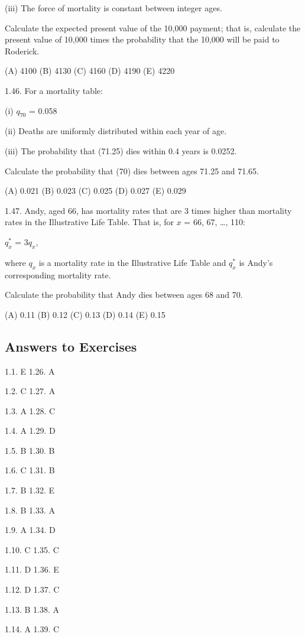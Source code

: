 \documentclass[]{book}
\begin{document}
(iii) The force of mortality is constant between integer ages.

Calculate the expected present value of the 10,000 payment; that is,
calculate the present value of 10,000 times the probability that the
10,000 will be paid to Roderick.

(A) 4100 (B) 4130 (C) 4160 (D) 4190 (E) 4220

1.46. For a mortality table:

(i) \(q_{70}\) = 0.058

(ii) Deaths are uniformly distributed within each year of age.

(iii) The probability that (71.25) dies within 0.4 years is 0.0252.

Calculate the probability that (70) dies between ages 71.25 and 71.65.

(A) 0.021 (B) 0.023 (C) 0.025 (D) 0.027 (E) 0.029

1.47. Andy, aged 66, has mortality rates that are 3 times higher than
mortality rates in the Illustrative Life Table. That is, for \(x\) = 66,
67, \ldots{}, 110:

\(q^{*}_x\) = 3\(q_x\),

where \(q_x\) is a mortality rate in the Illustrative Life Table and
\(q^{*}_x\) is Andy's corresponding mortality rate.

Calculate the probability that Andy dies between ages 68 and 70.

(A) 0.11 (B) 0.12 (C) 0.13 (D) 0.14 (E) 0.15

\subsection{Answers to Exercises}\label{answers-to-exercises}

1.1. E 1.26. A

1.2. C 1.27. A

1.3. A 1.28. C

1.4. A 1.29. D

1.5. B 1.30. B

1.6. C 1.31. B

1.7. B 1.32. E

1.8. B 1.33. A

1.9. A 1.34. D

1.10. C 1.35. C

1.11. D 1.36. E

1.12. D 1.37. C

1.13. B 1.38. A

1.14. A 1.39. C
\end{document}
